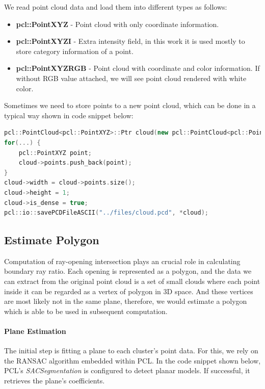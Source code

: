 \documentclass[11pt, a4paper,oneside,chapterprefix=false]{scrbook}
\begin{document}
We read point cloud data and load them into different types as follows:

\begin{itemize}
    \item \textbf{pcl::PointXYZ} - Point cloud with only coordinate information.
    \item \textbf{pcl::PointXYZI} - Extra intensity field, in this work it is used mostly to store category information of a point.
    \item \textbf{pcl::PointXYZRGB} - Point cloud with coordinate and color information. If without RGB value attached, we will see point cloud rendered with white color.
\end{itemize}

Sometimes we need to store points to a new point cloud, which can be done in a typical way shown in code snippet below:

\begin{lstlisting}[language=C++, caption=Save Point Cloud Data]
pcl::PointCloud<pcl::PointXYZ>::Ptr cloud(new pcl::PointCloud<pcl::PointXYZ>);
for(...) {
    pcl::PointXYZ point;
    cloud->points.push_back(point);
}
cloud->width = cloud->points.size();
cloud->height = 1;
cloud->is_dense = true;
pcl::io::savePCDFileASCII("../files/cloud.pcd", *cloud);
\end{lstlisting}

\subsection{Estimate Polygon}

Computation of ray-opening intersection plays an crucial role in calculating boundary ray ratio. Each opening is represented as a polygon, and the data we can extract from the original point cloud is a set of small clouds where each point inside it can be regarded as a vertex of polygon in 3D space. And these vertices are most likely not in the same plane, therefore, we would estimate a polygon which is able to be used in subsequent computation. 

\paragraph{Plane Estimation}

The initial step is fitting a plane to each cluster's point data. For this, we rely on the RANSAC algorithm embedded within PCL. In the code snippet shown below, PCL's \emph{SACSegmentation} is configured to detect planar models. If successful, it retrieves the plane's coefficients.
\end{document}
